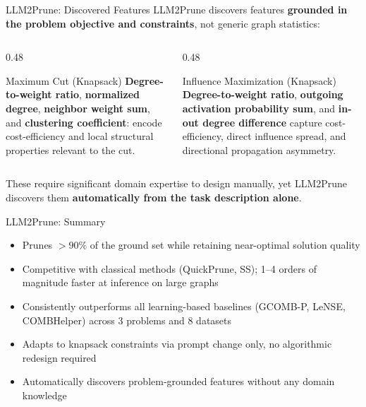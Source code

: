 \documentclass[aspectratio=169,xcolor=dvipsnames,8pt]{beamer}
\begin{document}
\begin{frame}{LLM2Prune: Discovered Features}
  LLM2Prune discovers features \textbf{grounded in the problem objective and constraints},
  not generic graph statistics:

  \vspace{0.3cm}

  \begin{columns}[T]
    \begin{column}{0.48\textwidth}
      \begin{block}{Maximum Cut (Knapsack)}
        \textbf{Degree-to-weight ratio}, \textbf{normalized degree},
        \textbf{neighbor weight sum}, and \textbf{clustering coefficient}:
        encode cost-efficiency and local structural properties relevant to the cut.
      \end{block}
    \end{column}
    \begin{column}{0.48\textwidth}
      \begin{block}{Influence Maximization (Knapsack)}
        \textbf{Degree-to-weight ratio}, \textbf{outgoing activation probability sum},
        and \textbf{in-out degree difference} capture cost-efficiency, direct
        influence spread, and directional propagation asymmetry.
      \end{block}
    \end{column}
  \end{columns}

  \vspace{0.3cm}
  \centering
  These require significant domain expertise to design manually, yet LLM2Prune
  discovers them \textbf{automatically from the task description alone}.
\end{frame}

\begin{frame}{LLM2Prune: Summary}
  \begin{itemize}
    \item Prunes $>90\%$ of the ground set while retaining near-optimal solution quality
    \item Competitive with classical methods (QuickPrune, SS); 1--4 orders of magnitude
      faster at inference on large graphs
    \item Consistently outperforms all learning-based baselines (GCOMB-P, LeNSE,
      COMBHelper) across 3 problems and 8 datasets
    \item Adapts to knapsack constraints via prompt change only,
      no algorithmic redesign required
    \item Automatically discovers problem-grounded features without any domain knowledge
  \end{itemize}

\end{frame}
\end{document}
